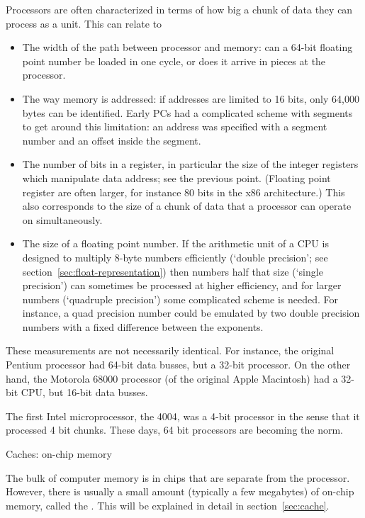 Processors are often characterized in terms of how big a chunk of data
they can process as a unit. This can relate to
\begin{itemize}
\item The width of the path between processor and memory: can a 64-bit
  floating point number be loaded in one cycle, or does it arrive in
  pieces at the processor.
\item The way memory is addressed: if addresses are limited to 16
  bits, only 64,000 bytes can be identified. Early PCs had a
  complicated scheme with segments to get around this limitation: an
  address was specified with a segment number and an offset inside the segment.
\item The number of bits in a register, in particular the size of the
  integer registers which manipulate data address; see the previous
  point. (Floating point register are often larger, for instance 80
  bits in the x86 architecture.) This also corresponds to the size of
  a chunk of data that a processor can operate on simultaneously.
\item The size of a floating point number. If the arithmetic unit of a
  \ac{CPU} is designed to multiply 8-byte numbers efficiently (`double
  precision'; see section~\ref{sec:float-representation}) then numbers half
  that size (`single precision') can sometimes be processed at higher
  efficiency, and for larger numbers (`quadruple precision') some
  complicated scheme is needed. For instance, a quad precision number
  could be emulated by two double precision numbers with a fixed
  difference between the exponents.
\end{itemize}
These measurements are not necessarily identical. For instance, the
original Pentium processor had 64-bit data busses, but a 32-bit
processor. On the other hand, the Motorola 68000 processor (of the
original Apple Macintosh) had a 32-bit \ac{CPU}, but 16-bit data busses.

The first Intel microprocessor, the 4004, was a 4-bit
processor in the sense that it processed 4 bit chunks. These days,
64 bit processors are becoming the norm.

 {Caches: on-chip memory}

The bulk of computer memory is in chips that are separate from the processor.
However, there is usually a small amount (typically a few megabytes)
of on-chip memory, called the . This will be 
explained in detail in section~\ref{sec:cache}.


